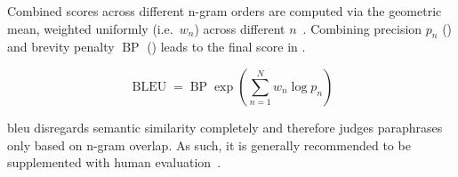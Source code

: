 Combined scores across different n-gram orders are computed via the geometric mean, weighted uniformly (i.e.\ $w_n$) across different $n$~\citep{papineni_bleu_2001,banerjee_METEOR_2005}.
Combining precision $p_n$ () and brevity penalty $\operatorname{BP}$ () leads to the final score in .

\begin{equation}
    \operatorname{BLEU} = \operatorname{BP}  \exp\left(\sum_{n=1}^{N} w_n  \log p_n\right)
\label{eq:bleu_final}
\end{equation}

\ac{bleu} disregards semantic similarity completely and therefore judges paraphrases only based on n-gram overlap. 
As such, it is generally recommended to be supplemented with human evaluation~\citep{zhou_paraphrase_2021}.





